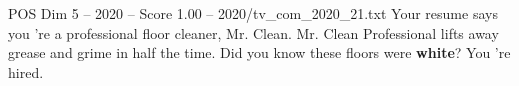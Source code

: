 \begin{textsample}{POS Dim 5 – 2020 – Score 1.00 – 2020/tv\_com\_2020\_21.txt}  \label{ex:f5_pos_034}
Your resume says you 're a professional floor cleaner, Mr.
Clean.
Mr.
Clean Professional lifts away grease and grime in half the time.
Did you know these floors were \textbf{white}?
You 're hired.

\end{textsample}
